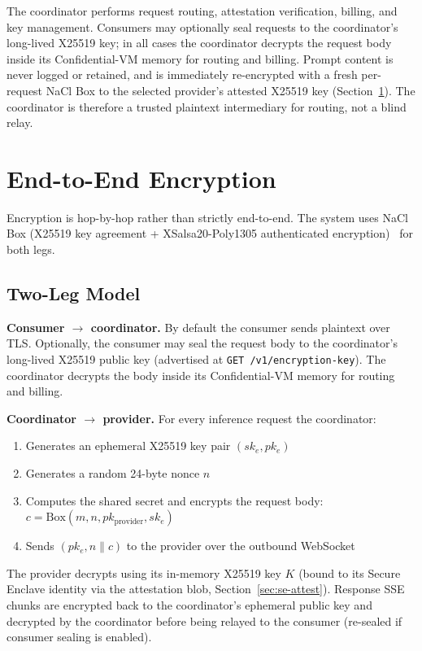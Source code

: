 \documentclass[10pt,twocolumn,letterpaper]{article}
\begin{document}
The coordinator performs request routing, attestation verification, billing, and key management. Consumers may optionally seal requests to the coordinator's long-lived X25519 key; in all cases the coordinator decrypts the request body inside its Confidential-VM memory for routing and billing. Prompt content is never logged or retained, and is immediately re-encrypted with a fresh per-request NaCl Box to the selected provider's attested X25519 key (Section~\ref{sec:e2e}). The coordinator is therefore a trusted plaintext intermediary for routing, not a blind relay.

\section{End-to-End Encryption}
\label{sec:e2e}

Encryption is hop-by-hop rather than strictly end-to-end. The system uses NaCl Box (X25519 key agreement + XSalsa20-Poly1305 authenticated encryption)~\cite{nacl} for both legs.

\subsection{Two-Leg Model}

\textbf{Consumer $\rightarrow$ coordinator.} By default the consumer sends plaintext over TLS. Optionally, the consumer may seal the request body to the coordinator's long-lived X25519 public key (advertised at \texttt{GET /v1/encryption-key}). The coordinator decrypts the body inside its Confidential-VM memory for routing and billing.

\textbf{Coordinator $\rightarrow$ provider.} For every inference request the coordinator:
\begin{enumerate}[leftmargin=*,itemsep=1pt]
    \item Generates an ephemeral X25519 key pair $(sk_e, pk_e)$
    \item Generates a random 24-byte nonce $n$
    \item Computes the shared secret and encrypts the request body: $c = \text{Box}(m, n, pk_{\text{provider}}, sk_e)$
    \item Sends $(pk_e, n \| c)$ to the provider over the outbound WebSocket
\end{enumerate}

The provider decrypts using its in-memory X25519 key $K$ (bound to its Secure Enclave identity via the attestation blob, Section~\ref{sec:se-attest}). Response SSE chunks are encrypted back to the coordinator's ephemeral public key and decrypted by the coordinator before being relayed to the consumer (re-sealed if consumer sealing is enabled).
\end{document}
